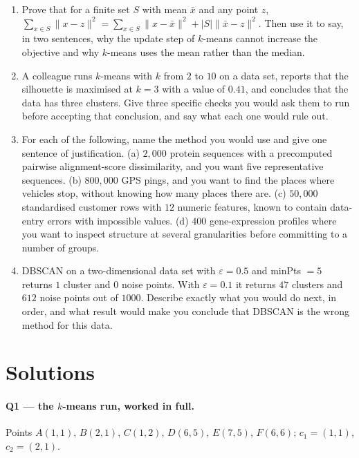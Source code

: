 \documentclass[11pt]{article}
\begin{document}
\begin{enumerate}[leftmargin=*, label=\textbf{Q\arabic*.}]
  \item Prove that for a finite set $S$ with mean $\bar{x}$ and any point
    $z$, $\sum_{x \in S}\lVert x - z\rVert^2
    = \sum_{x \in S}\lVert x - \bar{x}\rVert^2 + |S|\lVert\bar{x}-z\rVert^2$.
    Then use it to say, in two sentences, why the update step of $k$-means
    cannot increase the objective and why $k$-means uses the mean rather than
    the median.

  \item A colleague runs $k$-means with $k$ from $2$ to $10$ on a data set,
    reports that the silhouette is maximised at $k = 3$ with a value of
    $0.41$, and concludes that the data has three clusters. Give three
    specific checks you would ask them to run before accepting that
    conclusion, and say what each one would rule out.

  \item For each of the following, name the method you would use and give one
    sentence of justification.
    (a) $2{,}000$ protein sequences with a precomputed pairwise alignment-score
    dissimilarity, and you want five representative sequences.
    (b) $800{,}000$ GPS pings, and you want to find the places where vehicles
    stop, without knowing how many places there are.
    (c) $50{,}000$ standardised customer rows with $12$ numeric features,
    known to contain data-entry errors with impossible values.
    (d) $400$ gene-expression profiles where you want to inspect structure at
    several granularities before committing to a number of groups.

  \item DBSCAN on a two-dimensional data set with $\varepsilon = 0.5$ and
    minPts $= 5$ returns $1$ cluster and $0$ noise points. With
    $\varepsilon = 0.1$ it returns $47$ clusters and $612$ noise points out of
    $1000$. Describe exactly what you would do next, in order, and what
    result would make you conclude that DBSCAN is the wrong method for this
    data.
\end{enumerate}

\section{Solutions}
\label{sec:solutions}

\paragraph{Q1 --- the $k$-means run, worked in full.}
Points $A(1,1)$, $B(2,1)$, $C(1,2)$, $D(6,5)$, $E(7,5)$, $F(6,6)$;
$c_1 = (1,1)$, $c_2 = (2,1)$.
\end{document}
